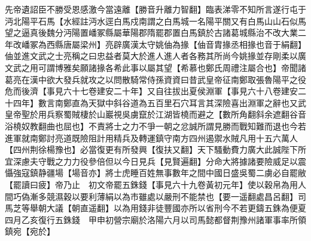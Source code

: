 先帝遺詔臣不勝受恩感激今當遠離【勝音升離力智翻】臨表涕零不知所言遂行屯于沔北陽平石馬【水經註沔水逕白馬戍南謂之白馬城一名陽平關又有白馬山山石似馬望之逼真後魏分沔陽置嶓冢縣屬華陽郡隋罷郡置白馬鎮於古諸葛城縣治不改大業二年改嶓冢為西縣唐屬梁州】亮辟廣漢太守姚伷為掾【伷音胄掾丞相掾也音于絹翻】伷並進文武之士亮稱之曰忠益者莫大於進人進人者各務其所尚今姚掾並存剛柔以廣文武之用可謂博雅矣願諸掾各希此事以屬其望【希慕也鄭氏周禮注屬合也】帝聞諸葛亮在漢中欲大發兵就攻之以問散騎常侍孫資資曰昔武皇帝征南鄭取張魯陽平之役危而後濟【事見六十七卷建安二十年】又自往拔出夏侯淵軍【事見六十八卷建安二十四年】數言南鄭直為天獄中斜谷道為五百里石穴耳言其深險喜出淵軍之辭也又武皇帝聖於用兵察蜀賊棲於山巖視吳虜竄於江湖皆橈而避之【數所角翻斜余遮翻谷音浴橈奴教翻曲也屈也】不責將士之力不爭一朝之忿誠所謂見勝而戰知難而退也今若進軍就南鄭討亮道既險阻計用精兵及轉運鎮守南方四州遏禦水賊凡用十五六萬人【四州荆徐楊豫也】必當復更有所發興【復扶又翻】天下騷動費力廣大此誠陛下所宜深慮夫守戰之力力役參倍但以今日見兵【見賢遍翻】分命大將據諸要險威足以震懾強寇鎮静疆場【場音亦】將士虎睡百姓無事數年之間中國日盛吳蜀二虜必自罷敝【罷讀曰疲】帝乃止　初文帝罷五銖錢【事見六十九卷黃初元年】使以穀帛為用人間巧偽漸多競濕穀以要利薄絹以為市雖處以嚴刑不能禁也【要一遥翻處昌呂翻】司馬芝等舉朝大議【朝直遥翻】以為用錢非徒豐國亦所以省刑今不若更鑄五銖為便夏四月乙亥復行五銖錢　甲申初營宗廟於洛陽六月以司馬懿都督荆豫州諸軍事率所領鎮宛【宛於】

